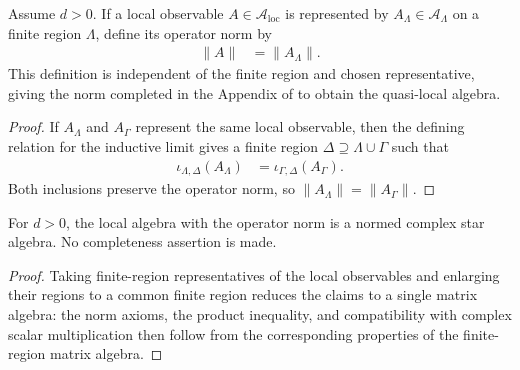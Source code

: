 \begin{definition}
    \label{def:qca_algebraic_local_operator_norm}
    \leanok
    Assume $d>0$.  If a local observable $A\in\mathcal A_{\mathrm{loc}}$
    is represented by $A_\Lambda\in\mathcal A_\Lambda$ on a finite region
    $\Lambda$, define its operator norm by
    \begin{align}
        \lVert A\rVert & =\lVert A_\Lambda\rVert.
    \end{align}
    This definition is independent of the finite region and chosen
    representative, giving the norm completed in the Appendix of
    \cite{Cirac2017MPU} to obtain the quasi-local algebra.
\end{definition}

\begin{proof}\leanok
    If $A_\Lambda$ and $A_\Gamma$ represent the same local observable, then
    the defining relation for the inductive limit gives a finite region
    $\Delta\supseteq\Lambda\cup\Gamma$ such that
    \begin{align}
        \iota_{\Lambda,\Delta}(A_\Lambda)
         & =\iota_{\Gamma,\Delta}(A_\Gamma).
    \end{align}
    Both inclusions preserve the operator norm, so
    $\lVert A_\Lambda\rVert=\lVert A_\Gamma\rVert$.
\end{proof}

\begin{definition}
    \label{def:qca_algebraic_local_normed_star_algebra}
    \leanok
    For $d>0$, the local algebra with the operator norm is a normed complex
    star algebra.  No completeness assertion is made.
\end{definition}

\begin{proof}\leanok
    Taking finite-region representatives of the local observables and enlarging
    their regions to a common finite region reduces the claims to a single matrix algebra: the norm axioms, the product
    inequality, and compatibility with complex scalar multiplication then
    follow from the corresponding properties of the finite-region matrix
    algebra.
\end{proof}

